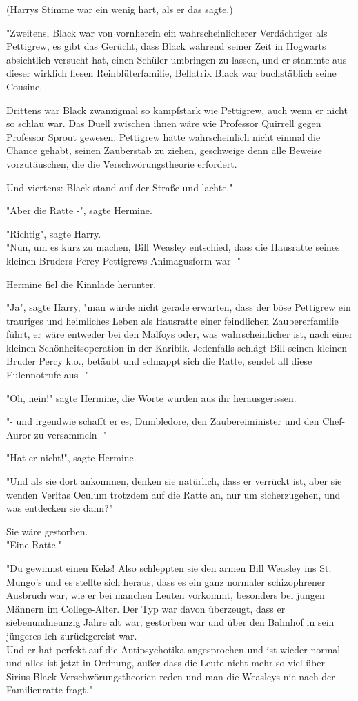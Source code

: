 {(Harrys Stimme war ein wenig hart, als er das sagte.)

"Zweitens, Black war von vornherein ein wahrscheinlicherer Verdächtiger als Pettigrew, es gibt das Gerücht, dass Black während seiner Zeit in Hogwarts absichtlich versucht hat, einen Schüler umbringen zu lassen, und er stammte aus dieser wirklich fiesen Reinblüterfamilie, Bellatrix Black war buchstäblich seine Cousine.

Drittens war Black zwanzigmal so kampfstark wie Pettigrew, auch wenn er nicht so schlau war. Das Duell zwischen ihnen wäre wie Professor Quirrell gegen Professor Sprout gewesen. Pettigrew hätte wahrscheinlich nicht einmal die Chance gehabt, seinen Zauberstab zu ziehen, geschweige denn alle Beweise vorzutäuschen, die die Verschwörungstheorie erfordert.

Und viertens: Black stand auf der Straße und lachte."

"Aber die Ratte -", sagte Hermine.

"Richtig", sagte Harry.\\ "Nun, um es kurz zu machen, Bill Weasley entschied, dass die Hausratte seines kleinen Bruders Percy Pettigrews Animagusform war -"

Hermine fiel die Kinnlade herunter.

"Ja", sagte Harry, "man würde nicht gerade erwarten, dass der böse Pettigrew ein trauriges und heimliches Leben als Hausratte einer feindlichen Zaubererfamilie führt, er wäre entweder bei den Malfoys oder, was wahrscheinlicher ist, nach einer kleinen Schönheitsoperation in der Karibik. Jedenfalls schlägt Bill seinen kleinen Bruder Percy k.o., betäubt und schnappt sich die Ratte, sendet all diese Eulennotrufe aus -"

"Oh, nein!" sagte Hermine, die Worte wurden aus ihr herausgerissen.

"- und irgendwie schafft er es, Dumbledore, den Zaubereiminister und den Chef-Auror zu versammeln -"

"Hat er nicht!", sagte Hermine.

"Und als sie dort ankommen, denken sie natürlich, dass er verrückt ist, aber sie wenden Veritas Oculum trotzdem auf die Ratte an, nur um sicherzugehen, und was entdecken sie dann?"

Sie wäre gestorben.\\ "Eine Ratte."

"Du gewinnst einen Keks! Also schleppten sie den armen Bill Weasley ins St. Mungo's und es stellte sich heraus, dass es ein ganz normaler schizophrener Ausbruch war, wie er bei manchen Leuten vorkommt, besonders bei jungen Männern im College-Alter. Der Typ war davon überzeugt, dass er siebenundneunzig Jahre alt war, gestorben war und über den Bahnhof in sein jüngeres Ich zurückgereist war.\\ Und er hat perfekt auf die Antipsychotika angesprochen und ist wieder normal und alles ist jetzt in Ordnung, außer dass die Leute nicht mehr so viel über Sirius-Black-Verschwörungstheorien reden und man die Weasleys nie nach der Familienratte fragt."

}
